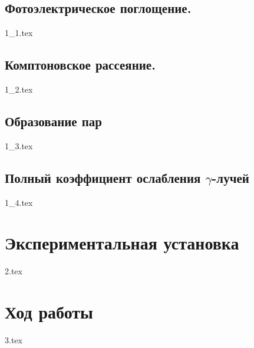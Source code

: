 \documentclass[a5paper, 10pt, twoside]{article} %
\begin{document}
  \subsection{Фотоэлектрическое поглощение.}
  {1_1.tex}

  \subsection{Комптоновское рассеяние.}
  {1_2.tex}

  \subsection{Образование пар}
  {1_3.tex}

  \subsection{Полный коэффициент ослабления $\gamma$-лучей}
  {1_4.tex}

\section{Экспериментальная установка}
{2.tex}

\section{Ход работы}
{3.tex}
\end{document}
